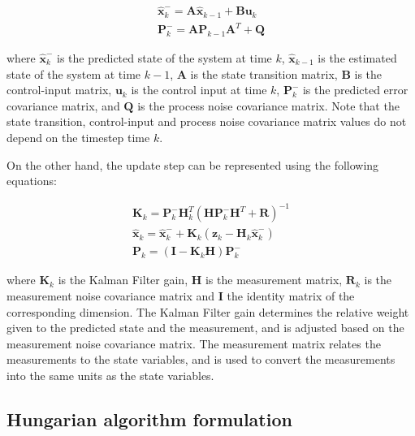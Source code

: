 \begin{equation}
\begin{split}
	\hat{\mathbf{x}}_k^- = \mathbf{A} \hat{\mathbf{x}}_{k-1} + \mathbf{B} \mathbf{u}_k \\
	\mathbf{P}_k^- = \mathbf{A} \mathbf{P}_{k-1} \mathbf{A}^T + \mathbf{Q}
\end{split}
\end{equation}

where $\hat{\mathbf{x}}_k^-$ is the predicted state of the system at time $k$, $\hat{\mathbf{x}}_{k-1}$ is the estimated state of the system at time $k-1$, $\mathbf{A}$ is the state transition matrix, $\mathbf{B}$ is the control-input matrix, $\mathbf{u}_k$ is the control input at time $k$, $\mathbf{P}_k^-$ is the predicted error covariance matrix, and $\mathbf{Q}$ is the process noise covariance matrix. Note that the state transition, control-input and process noise covariance matrix values do not depend on the timestep time $k$.

On the other hand, the update step can be represented using the following equations:

\begin{equation}
	\begin{split}
		\mathbf{K}_k = \mathbf{P}_k^- \mathbf{H}_k^T (\mathbf{H} \mathbf{P}_k^- \mathbf{H}^T + \mathbf{R})^{-1} \\
		\hat{\mathbf{x}}_k = \hat{\mathbf{x}}_k^- + \mathbf{K}_k (\mathbf{z}_k - \mathbf{H}_k \hat{\mathbf{x}}_k^-) \\
		\mathbf{P}_k = (\mathbf{I} - \mathbf{K}_k \mathbf{H}) \mathbf{P}_k^-
	\end{split}
\end{equation}

where $\mathbf{K}_k$ is the Kalman Filter gain, $\mathbf{H}$ is the measurement matrix, $\mathbf{R}_k$ is the measurement noise covariance matrix and $\mathbf{I}$ the identity matrix of the corresponding dimension. The Kalman Filter gain determines the relative weight given to the predicted state and the measurement, and is adjusted based on the measurement noise covariance matrix. The measurement matrix relates the measurements to the state variables, and is used to convert the measurements into the same units as the state variables.

\subsection{Hungarian algorithm formulation}
\label{subsec:3_HA_formulation}

